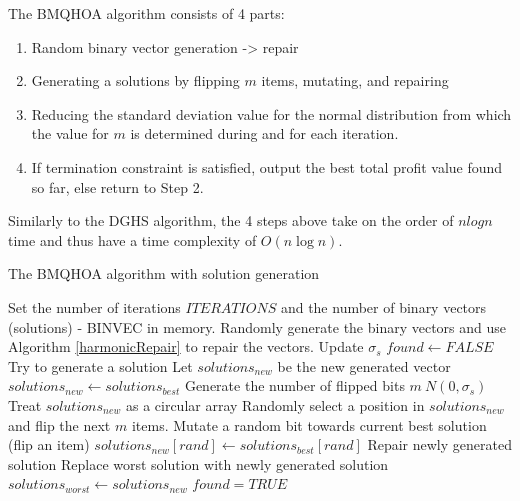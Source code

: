 \documentclass[titlepage]{article}
\begin{document}
The BMQHOA algorithm consists of 4 parts:
\begin{enumerate}
    \item Random binary vector generation -> repair
    \item Generating a solutions by flipping $m$ items, mutating, and repairing
    \item Reducing the standard deviation value for the normal distribution from which the value for $m$ is determined during and for each iteration.
    \item If termination constraint is satisfied, output the best total profit value found so far, else return to Step 2.
\end{enumerate}

Similarly to the DGHS algorithm, the 4 steps above take on the order of $nlogn$ time and thus have a time complexity of ${O}(n\log{}n)$.

\begin{breakablealgorithm}
\caption{The BMQHOA algorithm with solution generation}\label{BMQHOA}
    \begin{algorithmic}[1]
        \State Set the number of iterations $ITERATIONS$ and the number of binary vectors (solutions) - BINVEC in memory.
        \State Randomly generate the binary vectors and use Algorithm \ref{harmonicRepair} to repair the vectors. 
            \State Update $\sigma_{s}$
            \State $found \gets FALSE$
                \State Try to generate a solution
                \State Let $solutions_{new}$ be the new generated vector 
                \State $solutions_{new} \gets solutions_{best}$
                \State Generate the number of flipped bits $m ~ N(0, \sigma_{s})$
                \State Treat $solutions_{new}$ as a circular array
                \State Randomly select a position in $solutions_{new}$ and flip the next $m$ items.
                \State Mutate a random bit towards current best solution (flip an item)
                \State $solutions_{new}[rand] \gets solutions_{best}[rand]$
                \State Repair newly generated solution
                    \State Replace worst solution with newly generated solution
                    \State $solutions_{worst} \gets solutions_{new}$
                    \State $found = TRUE$
                \EndIf
            \EndWhile
        \EndWhile
    \end{algorithmic}
\end{breakablealgorithm}
\vskip 0.5cm
\end{document}

